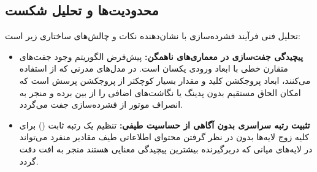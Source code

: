 \subsection{محدودیت‌ها و تحلیل شکست}
تحلیل فنی فرآیند فشرده‌سازی با  نشان‌دهنده نکات و چالش‌های ساختاری زیر است:
\begin{itemize}
    \item \textbf{پیچیدگی جفت‌سازی در معماری‌های ناهمگن:} پیش‌فرض الگوریتم  وجود جفت‌های متقارن خطی با ابعاد ورودی یکسان است. در مدل‌های مدرنی که از  استفاده می‌کنند، ابعاد پروجکشن کلید و مقدار بسیار کوچکتر از پروجکشن پرسش است که امکان الحاق مستقیم بدون پدینگ یا نگاشت‌های اضافی را از بین برده و منجر به انصراف موتور از فشرده‌سازی جفت می‌گردد.
    \item \textbf{تثبیت رتبه سراسری بدون آگاهی از حساسیت طیفی:} تنظیم یک رتبه ثابت () برای کلیه زوج لایه‌ها بدون در نظر گرفتن محتوای اطلاعاتی طیف مقادیر منفرد می‌تواند در لایه‌های میانی که دربرگیرنده بیشترین پیچیدگی معنایی هستند منجر به افت دقت گردد.
\end{itemize}
